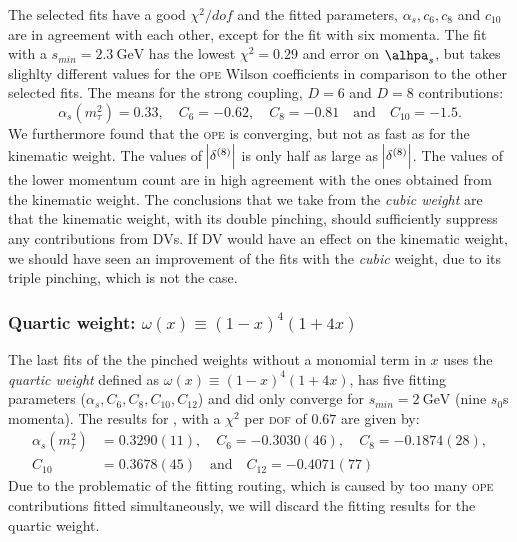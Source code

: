 \documentclass[../../index.tex]{subfiles}
\begin{document}
The selected fits have a good \(\chi^2/dof\) and the fitted parameters,
\(\alpha_s, c_6, c_8\) and \(c_{10}\) are in agreement with each other, except
for the fit with six momenta. The fit with a \(s_{min}=\SI{2.3}{\giga\eV}\) has
the lowest \(\chi^2=0.29\) and error on \(\alhpa_s\), but takes slighlty
different values for the \textsc{ope} Wilson coefficients in comparison to the
other selected fits. The means for the strong coupling, \(D=6\) and \(D=8\)
contributions:
\begin{equation}
  \label{eq:wKinResult}
  \alpha_s(m_\tau^2)=0.33, \quad C_6=-0.62, \quad C_8=-0.81 \quad \text{and} \quad C_{10}=-1.5.
\end{equation}
We furthermore found that the \textsc{ope} is converging, but not as fast as for
the kinematic weight. The values of \(\abs{\delta^{(8)}}\) is only half as large
as \(\abs{\delta^{(8)}}\). The values of the lower momentum count are in high
agreement with the ones obtained from the kinematic weight. The conclusions that
we take from the \textit{cubic weight} are that the kinematic weight, with its
double pinching, should sufficiently suppress any contributions from
\textsc{DV}s. If \textsc{DV} would have an effect on the kinematic weight, we
should have seen an improvement of the fits with the \textit{cubic} weight, due
to its triple pinching, which is not the case.

\subsubsection{Quartic weight: \(\omega(x) \equiv (1-x)^4(1+4x)\)}
\label{sec:quarticWeight}
The last fits of the the pinched weights without a monomial term in \(x\)
uses the \textit{quartic weight} defined as \(\omega(x) \equiv (1-x)^4(1+4x)\),
has five fitting parameters (\(\alpha_s, C_6, C_8, C_{10}, C_{12}\)) and
did only converge for \(s_{min}=\SI{2}{\giga\eV}\) (nine \(s_0\)s momenta).
The results for , with a \(\chi^2\) per \textsc{dof} of \(0.67\) are given by:
\begin{equation}
  \begin{split}
    \alpha_s(m_\tau^2) &= 0.3290(11), \quad C_6=-0.3030(46), \quad C_8=-0.1874(28), \\
    C_{10} &= 0.3678(45) \quad \text{and} \quad C_{12}=-0.4071(77)
  \end{split}
\end{equation}
Due to the problematic of the fitting routing, which is caused by too many
\textsc{ope} contributions fitted simultaneously, we will discard the fitting
results for the quartic weight.
\end{document}

